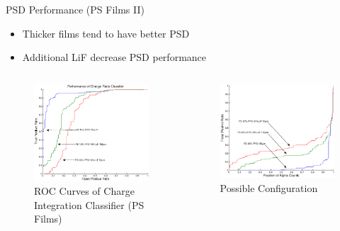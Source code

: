 \begin{frame}{PSD Performance (PS Films II)}
\small
\begin{itemize}
	\item Thicker films tend to have better PSD
	\item Additional LiF decrease PSD performance
\end{itemize}
\begin{columns}[onlytextwidth]
\begin{column}{0.45\textwidth}
	\tiny
	\begin{figure}
		\centering
		\includegraphics[width=\textwidth]{images/ROC_Comparison.eps}
		\caption{ROC Curves of Charge Integration Classifier (PS Films)}
	\end{figure}
\end{column}
\begin{column}{0.45\textwidth}
	\tiny
	\begin{figure}
		\centering
		\includegraphics[width=\textwidth]{images/FPRvsFractionCounts_Comparison.eps}
		\caption{Possible Configuration}
	\end{figure}
\end{column}
\end{columns}
\end{frame}

